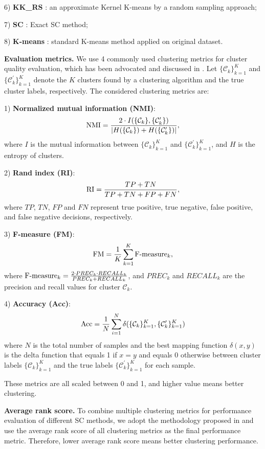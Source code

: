 \documentclass[sigconf]{acmart}
\newcommand{\1}{\boldsymbol{1}}
\newcommand{\cC}{\mathcal{C}}
\newcommand{\0}{\boldsymbol{0}}
\begin{document}
6) \textbf{KK\_RS} \cite{chitta2011approximate}: an approximate Kernel K-means by a random sampling approach; 

7) \textbf{SC} \cite{ng2002spectral}: Exact SC method; 

8) \textbf{K-means} \cite{hartigan1979algorithm}: standard K-means method applied on original dataset. 

\textbf{Evaluation metrics.} We use 4 commonly used clustering metrics for cluster quality evaluation, which has been advocated and discussed in \cite{zaki2014data}.
Let  $\{\cC_k\}_{k=1}^K$ and $\{\cC^\prime_k\}_{k=1}^{K}$ denote the $K$  clusters found by a clustering algorithm and the true cluster labels, respectively. The considered clustering metrics are: 

1) \textbf{Normalized mutual information (NMI)}: 
$$	
\textnormal{NMI}=\frac{2 \cdot I(\{\cC_k\},\{\cC^\prime_k\})}{|H(\{\cC_k\})+H(\{\cC^\prime_k\})|},
$$ 
where $I$ is the mutual information between $\{\cC_k\}_{k=1}^K$ and $\{\cC^\prime_k\}_{k=1}^{K}$, and $H$ is the entropy of clusters.

2) \textbf{Rand index (RI)}: 
$$
\textnormal{RI}=\frac{TP+TN}{TP+TN+FP+FN},
$$ 
where $TP$, $TN$, $FP$ and $FN$ represent true positive, true negative, false positive, and false negative decisions, respectively. 

3) \textbf{F-measure (FM)}: 
$$
\textnormal{FM}=\frac{1}{K} \sum_{k=1}^K \textnormal{F-measure}_k,
$$ 
where $	\textnormal{F-measure}_k= \frac{2 \cdot PREC_k \cdot RECALL_k}{PREC_k + RECALL_k}$, and $PREC_k $ and $RECALL_k$ are the precision and recall values for cluster $\cC_k$.

4) \textbf{Accuracy (Acc)}: 
$$
\textnormal{Acc}=\frac{1}{N} \sum_{i=1}^N \delta(\{\cC_k\}_{k=1}^K,\{\cC^\prime_k\}_{k=1}^{K})
$$
where $N$ is the total number of samples and the best mapping function $\delta(x,y)$ is the delta function that equals 1 if $x=y$ and equals 0 otherwise between cluster labels $\{\cC_k\}_{k=1}^K$ and the true labels $\{\cC^\prime_k\}_{k=1}^{K}$ for each sample. 

These metrics are all scaled between 0 and 1, and higher value means better clustering.

\textbf{Average rank score.} To combine multiple clustering metrics for performance evaluation of different SC methods, we adopt the methodology proposed in \cite{yang2015defining} and use the average rank score of all clustering metrics as the final performance metric. Therefore, lower average rank score means better clustering performance.
\end{document}
